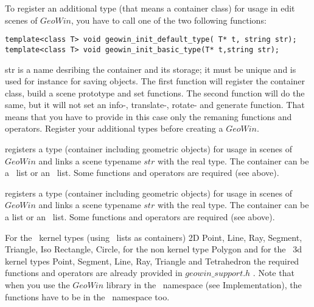 \begin{enumerate}
To register an additional type (that means a container class) for usage in 
edit scenes of $GeoWin$, you
have to call one of the two following functions:
\begin{verbatim}
template<class T> void geowin_init_default_type( T* t, string str);
template<class T> void geowin_init_basic_type(T* t,string str);
\end{verbatim}
str is a name desribing the container and its storage; it must be unique and is used for instance
for saving objects.
The first function will register the container class, build a scene prototype and set functions.
The second function will do the same, but it will not set an info-, translate-, rotate- and generate
function. That means that you have to provide in this case only the remaning functions and operators.
Register your additional types before creating a $GeoWin$.

\end{enumerate}


{ registers a type (container including geometric objects) for usage
  in scenes of $GeoWin$
  and links a scene typename $str$ with the real type. The container can be a \leda\ list 
  or an \stl\ list. Some functions and operators are required (see above).
}

{ registers a type (container including geometric objects) for usage
  in scenes of $GeoWin$
  and links a scene typename $str$ with the real type. The container can be a \leda
  list or an \stl\ list. Some functions and operators are required (see above).
}

For the \cgal\ kernel types (using \stl\ lists as containers)  
2D Point, Line, Ray, Segment, Triangle, Iso Rectangle, Circle,
for the non kernel type Polygon and for the \cgal\ 3d kernel types Point,
Segment, Line, Ray, Triangle and Tetrahedron the required functions and operators
are already provided in $geowin\_support.h$ .
Note that when you use the $GeoWin$ library in the \cgal\ namespace (see Implementation), the
functions have to be in the \cgal\ namespace too.

